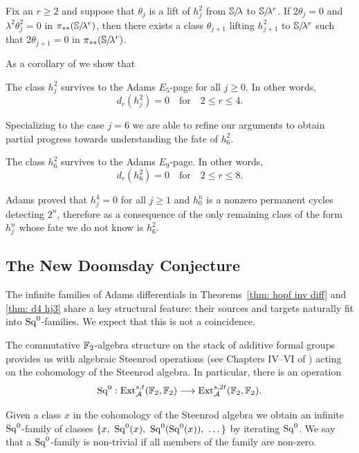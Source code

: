 \begin{thm} \label{thm:inductive-intro} %
  Fix an $r \geq 2$ and suppose that $\theta_j$ is a lift of $h_j^2$ from $\operatorname{\mathbb{S}}\hspace{-2.2pt}/\!\lambda$ to $\operatorname{\mathbb{S}}\hspace{-2.2pt}/\!\lambda^r$.
  If $2\theta_j = 0$ and $\lambda^2 \theta_j^2 = 0$ in $\pi_{**}(\operatorname{\mathbb{S}}\hspace{-2.2pt}/\!\lambda^r)$,
  then there exists a class $\theta_{j+1}$ lifting $h_{j+1}^2$ to $\operatorname{\mathbb{S}}\hspace{-2.2pt}/\!\lambda^r$ such that $2\theta_{j+1} = 0$ in $\pi_{**}(\operatorname{\mathbb{S}}\hspace{-2.2pt}/\!\lambda^r)$.
\end{thm}

As a corollary of  we show that
\begin{cor}
The class $h_j^2$ survives to the Adams $E_5$-page for all $j \geq 0$. In other words,
  \[ d_r(h_j^2) = 0 \quad\text{for}\quad 2 \leq r \leq 4.\]
\end{cor}

Specializing to the case $j=6$ we are able to %
refine our arguments to obtain partial progress towards understanding the fate of $h_6^2$.

\begin{thm} \label{thm:h62-intro}
  The class $h_6^2$ survives to the Adams $E_9$-page. In other words,
  \[ d_r(h_6^2) = 0 \quad\text{for}\quad 2 \leq r \leq 8.\]
\end{thm}


\begin{rmk}
  Adams proved that $h_j^4 = 0$ for all $j \geq 1$ and $h_0^n$ is a nonzero permanent cycles detecting $2^n$, therefore as a consequence of  the only remaining class of the form $h_j^n$ whose fate we do not know is $h_6^2$.
\end{rmk}

\subsection*{The New Doomsday Conjecture}\hfill

The infinite families of Adams differentials in Theorems~\ref{thm: hopf inv diff} and \ref{thm: d4 hj3} share a key structural feature: their sources and targets naturally fit into $\operatorname{\mathrm{Sq}}^0$-families. We expect that this is not a coincidence.

\begin{rec} \label{rec:sq0}
The commutative $\operatorname{\mathbb{F}}_2$-algebra structure on the stack of additive formal groups 
provides us with algebraic Steenrod operations (see Chapters IV--VI of \cite{BMMS})
acting on the cohomology of the Steenrod algebra. 
In particular, there is an operation
$$\operatorname{\mathrm{Sq}}^0: \operatorname{\mathrm{Ext}}^{s, t}_{\operatorname{\mathcal{A}}}(\mathbb{F}_2, \mathbb{F}_2) \longrightarrow \operatorname{\mathrm{Ext}}^{s, 2t}_{\operatorname{\mathcal{A}}}(\mathbb{F}_2, \mathbb{F}_2).$$

Given a class $x$ in the cohomology of the Steenrod algebra we obtain an infinite $\operatorname{\mathrm{Sq}}^0$-family of classes $\{x,\ \operatorname{\mathrm{Sq}}^0(x),\ \operatorname{\mathrm{Sq}}^0(\operatorname{\mathrm{Sq}}^0(x)),\ \dots\}$ by iterating $\operatorname{\mathrm{Sq}}^0$. 
We say that a $\operatorname{\mathrm{Sq}}^0$-family is non-trivial if all members of the family are non-zero.
\end{rec}

